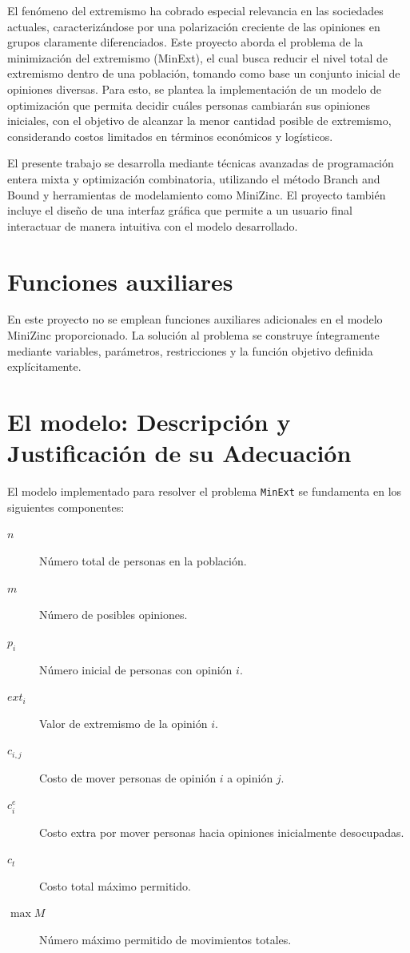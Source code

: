 \documentclass[11pt,letter]{article}
\begin{document}
El fenómeno del extremismo ha cobrado especial relevancia en las sociedades actuales, caracterizándose por una polarización creciente de las opiniones en grupos claramente diferenciados. Este proyecto aborda el problema de la minimización del extremismo (MinExt), el cual busca reducir el nivel total de extremismo dentro de una población, tomando como base un conjunto inicial de opiniones diversas. Para esto, se plantea la implementación de un modelo de optimización que permita decidir cuáles personas cambiarán sus opiniones iniciales, con el objetivo de alcanzar la menor cantidad posible de extremismo, considerando costos limitados en términos económicos y logísticos.

El presente trabajo se desarrolla mediante técnicas avanzadas de programación entera mixta y optimización combinatoria, utilizando el método Branch and Bound y herramientas de modelamiento como MiniZinc. El proyecto también incluye el diseño de una interfaz gráfica que permite a un usuario final interactuar de manera intuitiva con el modelo desarrollado.


\newpage

\section{Funciones auxiliares}

  En este proyecto no se emplean funciones auxiliares adicionales en el modelo MiniZinc proporcionado. La solución al problema se construye íntegramente mediante variables, parámetros, restricciones y la función objetivo definida explícitamente.

\newpage
\section{El modelo: Descripción y Justificación de su Adecuación}

El modelo implementado para resolver el problema \texttt{MinExt} se fundamenta en los siguientes componentes:

\begin{description}
  \item[$n$] Número total de personas en la población.
  \item[$m$] Número de posibles opiniones.
  \item[$p_i$] Número inicial de personas con opinión $i$.
  \item[$\mathit{ext}_i$] Valor de extremismo de la opinión $i$.
  \item[$c_{i,j}$] Costo de mover personas de opinión $i$ a opinión $j$.
  \item[$c^e_i$] Costo extra por mover personas hacia opiniones inicialmente desocupadas.
  \item[$c_t$] Costo total máximo permitido.
  \item[$\max M$] Número máximo permitido de movimientos totales.
\end{description}
\end{document}
